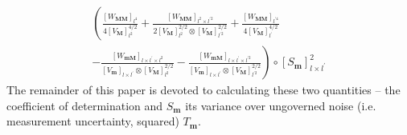 \documentclass[preprint,12pt]{elsarticle}
\newcommand*{\x}{\times}
\newcommand*{\mi}[1]{\mathbf{#1}}
\newcommand*{\te}[2][]{\left\lbrack{#2}\right\rbrack_{#1}}
\begin{document}
    \begin{multline}\label{eq:COD:correction}
        \left(
            \frac{\te[l^{4}]{W_\mi{MM}}}{4\te[l^{2}]{V_\mi{M}}^{4/2}} + 
            \frac{\te[l^{2}\x l^{\prime 2}]{W_\mi{MM}}}{2\te[l^{2}]{V_\mi{M}}^{2/2} \otimes \te[l^{\prime 2}]{V_\mi{M}}^{2/2}} + 
            \frac{\te[l^{\prime 4}]{W_\mi{MM}}}{4\te[l^{\prime}]{V_\mi{M}}^{4/2}} \right. \\
        \left. 
            -\frac{\te[l\x l^{\prime}\x l^{2}]{W_\mi{mM}}}{\te[l\x l^{\prime}]{V_\mi{m}} \otimes \te[l^{2}]{V_\mi{M}}^{2/2}}
            -\frac{\te[l\x l^{\prime}\x l^{\prime 2}]{W_\mi{mM}}}{\te[l\x l^{\prime}]{V_\mi{m}} \otimes \te[l^{\prime 2}]{V_\mi{M}}^{2/2}} \right) \circ \te[l\x l^{\prime}]{S_{\mi{m}}}^{2}
    \end{multline}
    The remainder of this paper is devoted to calculating these two quantities -- the coefficient of determination and $S_{\mi{m}}$ its variance over ungoverned noise (i.e. measurement uncertainty, squared) $T_{\mi{m}}$.
\end{document}
